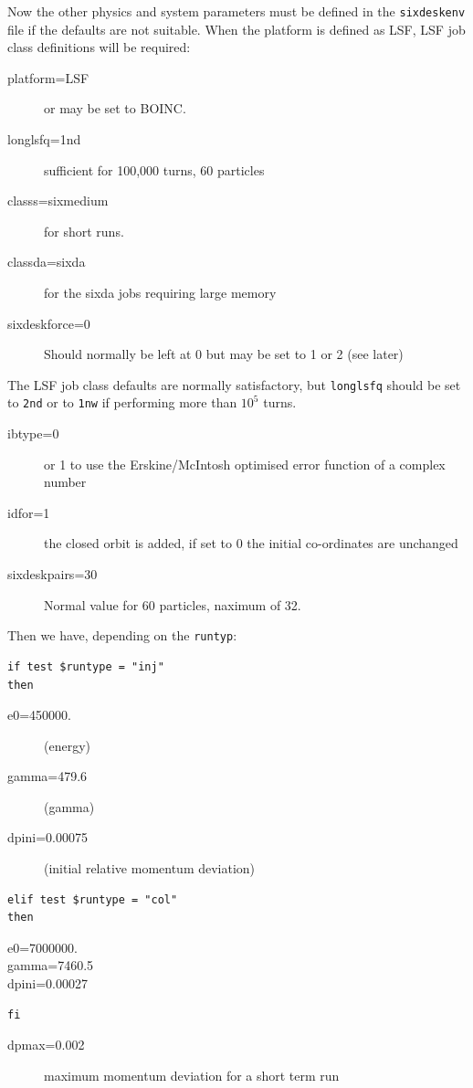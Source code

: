 \documentclass{article}    %
\begin{document}
Now the other physics and system parameters must be defined in the
{\tt sixdeskenv} file if the defaults are not suitable.
When the platform is defined as LSF, 
LSF job class definitions will be required:
\begin{description}
\item[platform=LSF] or may be set to BOINC.
\item[longlsfq=1nd] sufficient for 100,000 turns, 60 particles
\item[classs=sixmedium] for short runs.
\item[classda=sixda] for the sixda jobs requiring large memory
\item[sixdeskforce=0] Should normally be left at 0 but may be set to 1 or 2 (see later)
\end{description}
The LSF job class defaults are normally satisfactory, but {\tt longlsfq}
should be set to {\tt 2nd} or to {\tt 1nw} if performing more than $10^5$ turns.

\begin{description}
\item[ibtype=0] or 1 to use the Erskine/McIntosh optimised error function
of a complex number
\item[idfor=1] the closed orbit is added, if set to 0 the initial co-ordinates are unchanged
\item[sixdeskpairs=30] Normal value for 60 particles, naximum of 32. 
\end{description}

Then we have, depending on the {\tt runtyp}:
\begin{verbatim}
if test $runtype = "inj"
then
\end{verbatim}
\begin{description}
\item[e0=450000.] (energy)
\item[gamma=479.6] (gamma)
\item[dpini=0.00075] (initial relative momentum deviation)
\end{description}
\begin{verbatim}
elif test $runtype = "col"
then
\end{verbatim}
\begin{description}
\item[e0=7000000.]
\item[gamma=7460.5]
\item[dpini=0.00027]
\end{description}
\begin{verbatim}
fi
\end{verbatim}
\begin{description}
\item[dpmax=0.002] maximum momentum deviation for a short term run
\end{description}
\end{document}

